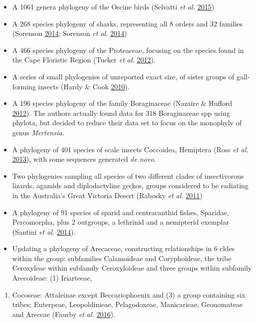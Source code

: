 \documentclass[]{article}
\providecommand{\tightlist}{%
  \setlength{\itemsep}{0pt}\setlength{\parskip}{0pt}}
\begin{document}
\begin{enumerate}
\begin{itemize}
  \item
    A 1061 genera phylogeny of the Oscine birds (Selvatti \emph{et al.} \protect\hyperlink{ref-selvatti2015paleogene}{2015})
  \item
    A 268 species phylogeny of sharks, representing all 8 orders and 32 families (Sorenson \protect\hyperlink{ref-sorenson2014evolution}{2014}; Sorenson \emph{et al.} \protect\hyperlink{ref-sorenson2014effect}{2014})
  \item
    A 466 species phylogeny of the Proteaceae, focusing on the species found in the Cape Floristic Region (Tucker \emph{et al.} \protect\hyperlink{ref-tucker2012incorporating}{2012}).
  \item
    A series of small phylogenies of unreported exact size, of sister groups of gall-forming insects (Hardy \& Cook \protect\hyperlink{ref-hardy2010gall}{2010}).
  \item
    A 196 species phylogeny of the family Boraginaceae (Nazaire \& Hufford \protect\hyperlink{ref-nazaire2012broad}{2012}). The authors
    actually found data for 318 Boraginaceae spp using phylota, but decided to reduce
    their data set to focus on the monophyly of genus \emph{Mertensia}.
  \item
    A phylogeny of 401 species of scale insects Coccoidea, Hemiptera (Ross \emph{et al.} \protect\hyperlink{ref-ross2013large}{2013}),
    with some sequences generated \emph{de novo}.
  \item
    Two phylogenies sampling all species of two different clades of insectivorous
    lizards, agamids and diplodactyline geckos, groups considered to be radiating
    in the Australia's Great Victoria Desert (Rabosky \emph{et al.} \protect\hyperlink{ref-rabosky2011species}{2011})
  \item
    A phylogeny of 91 species of sparid and centracanthid fishes, Sparidae, Percomorpha,
    plus 2 outgroups, a lethrinid and a nemipterid exemplar (Santini \emph{et al.} \protect\hyperlink{ref-santini2014first}{2014}).
  \item
    Updating a phylogeny of Arecaceae, constructing relationships in 6 cldes within
    the group: subfamilies Calamoideae and Coryphoideae, the tribe Ceroxyleae within
    subfamily Ceroxyloideae and three groups within subfamily Arecoideae: (1) Iriarteeae,
  \end{itemize}

  \begin{enumerate}
  \def\labelenumii{(\arabic{enumii})}
  \setcounter{enumii}{1}
  \tightlist
  \item
    Cocoseae: Attaleinae except Beccariophoenix and (3) a group containing six
    tribes; Euterpeae, Leopoldinieae, Pelagodoxeae, Manicarieae, Geonomateae and Areceae
    (Faurby \emph{et al.} \protect\hyperlink{ref-faurby2016all}{2016}).
  \end{enumerate}


\end{enumerate}
\end{document}
